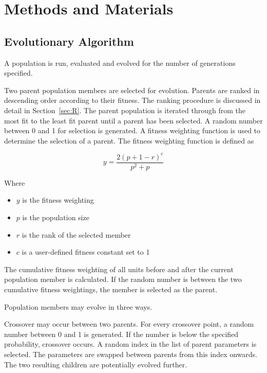 \chapter{Methods and Materials}
\label{chp:MaM}

\section{Evolutionary Algorithm}
\label{sec:EA}

A population is run, evaluated and evolved for the number of generations specified.

Two parent population members are selected for evolution. Parents are ranked in descending order according to their fitness. The ranking procedure is discussed in detail in Section~\ref{sec:R}. The parent population is iterated through from the most fit to the least fit parent until a parent has been selected. A random number between 0 and 1 for selection is generated. A fitness weighting function is used to determine the selection of a parent. The fitness weighting function is defined as

\begin{equation}
	y=\frac{2\left ( p+1-r \right )^{c}}{p^{2}+p}
\end{equation}

Where

\begin{itemize}
	\item $y$ is the fitness weighting
	\item $p$ is the population size
	\item $r$ is the rank of the selected member
	\item $c$ is a user-defined fitness constant set to 1
\end{itemize}

The cumulative fitness weighting of all units before and after the current population member is calculated. If the random number is between the two cumulative fitness weightings, the member is selected as the parent.

Population members may evolve in three ways.

Crossover may occur between two parents. For every crossover point, a random number between 0 and 1 is generated. If the number is below the specified probability, crossover occurs. A random index in the list of parent parameters is selected. The parameters are swapped between parents from this index onwards. The two resulting children are potentially evolved further.

